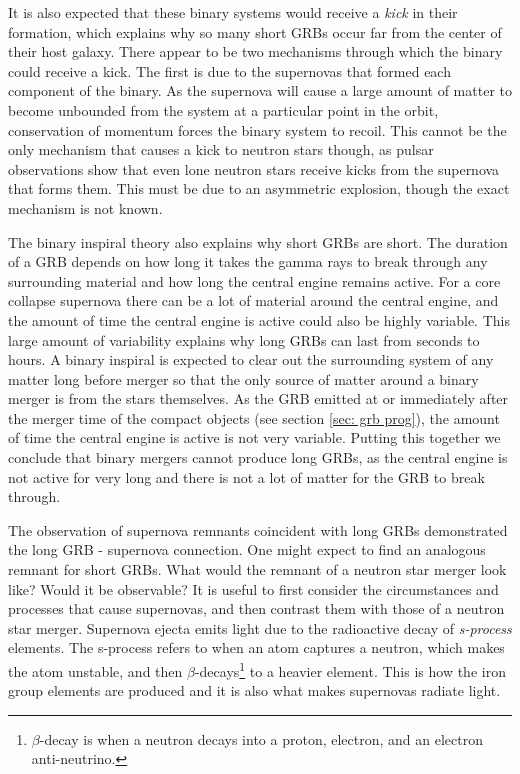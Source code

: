 \documentclass[11pt]{cuthesis}
\begin{document}
It is also expected that these binary systems would receive a \textit{kick} in their formation, which explains why so many short GRBs occur far from the center of their host galaxy. There appear to be two mechanisms through which the binary could receive a kick. The first is due to the supernovas that formed each component of the binary. As the supernova will cause a large amount of matter to become unbounded from the system at a particular point in the orbit, conservation of momentum forces the binary system to recoil. This cannot be the only mechanism that causes a kick to neutron stars though, as pulsar observations show that even lone neutron stars receive kicks from the supernova that forms them. This must be due to an asymmetric explosion, though the exact mechanism is not known. 

The binary inspiral theory also explains why short GRBs are short. The duration of a GRB depends on how long it takes the gamma rays to break through any surrounding material and how long the central engine remains active. For a core collapse supernova there can be a lot of material around the central engine, and the amount of time the central engine is active could also be highly variable. This large amount of variability explains why long GRBs can last from seconds to hours. A binary inspiral is expected to clear out the surrounding system of any matter long before merger so that the only source of matter around a binary merger is from the stars themselves. As the GRB emitted at or immediately after the merger time of the compact objects (see section \ref{sec: grb prog}), the amount of time the central engine is active is not very variable. Putting this together we conclude that binary mergers cannot produce long GRBs, as the central engine is not active for very long and there is not a lot of matter for the GRB to break through.

The observation of supernova remnants coincident with long GRBs demonstrated the long GRB - supernova connection. One might expect to find an analogous remnant for short GRBs. What would the remnant of a neutron star merger look like? Would it be observable? It is useful to first consider the circumstances and processes that cause supernovas, and then contrast them with those of a neutron star merger. Supernova ejecta emits light due to the radioactive decay of \textit{s-process} elements. The s-process refers to when an atom captures a neutron, which makes the atom unstable, and then $\beta$-decays\footnote{$\beta$-decay is when a neutron decays into a proton, electron, and an electron anti-neutrino.} to a heavier element. This is how the iron group elements are produced and it is also what makes supernovas radiate light.
\end{document}
